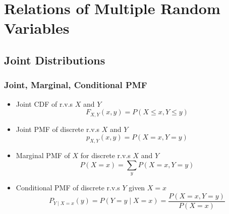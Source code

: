 \section{Relations of Multiple Random Variables}

\subsection{Joint Distributions}

\subsubsection*{Joint, Marginal, Conditional PMF}
\begin{itemize}
    \item Joint CDF of r.v.s $X$ and $Y$
    \begin{equation}
        F_{X,Y}(x,y)=P(X\leq x,Y\leq y)
    \end{equation}
    \item Joint PMF of discrete r.v.s $X$ and $Y$
    \begin{equation}
        p_{X,Y}(x,y)=P(X=x,Y=y)
    \end{equation}
    \item Marginal PMF of $X$ for discrete r.v.s $X$ and $Y$
    \begin{equation}
        P(X=x)=\sum_yP(X=x,Y=y)
    \end{equation}
    \item Conditional PMF of discrete r.v.s $Y$ given $X=x$
    \begin{equation}
        P_{Y\mid X=x}(y)=P(Y=y\mid X=x)=\frac{P(X=x,Y=y)}{P(X=x)}
    \end{equation}
\end{itemize}

